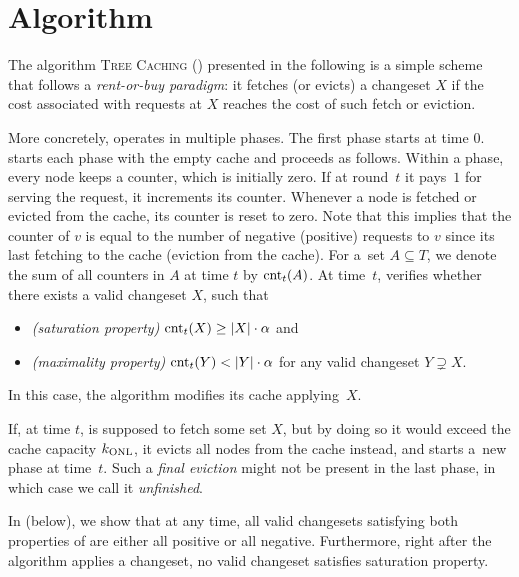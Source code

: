 
\section{Algorithm}\label{sec:algo}

The algorithm \textsc{Tree Caching} (\ALGTC) presented in the following is
a simple scheme that follows a \emph{rent-or-buy paradigm}: it fetches (or evicts)
a changeset $X$ if the cost associated with requests at $X$ reaches the cost of 
such fetch or eviction.

More concretely, \ALGTC operates in multiple phases. The first phase starts at time $0$.
\ALGTC starts each phase with the empty cache and proceeds as follows. Within a
phase, every node keeps a counter, which is initially zero. If at round~$t$ it
pays~$1$ for serving the request, it increments its counter. Whenever a node
is fetched or evicted from the cache, its counter is reset to zero. Note that
this implies that the counter of $v$ is equal to the number of negative
(positive) requests to $v$ since its last fetching to the cache (eviction from
the cache). For a~set $A \subseteq T$, we denote the sum of all counters in
$A$ at time $t$ by $\textrm{cnt}_t(A)$. At time~$t$, \ALGTC verifies whether
there exists a valid changeset $X$, such that
\begin{itemize}
\item \emph{(saturation property)} $\textrm{cnt}_t(X) \geq |X| \cdot \alpha$ and
\item \emph{(maximality property)} $\textrm{cnt}_t(Y) < |Y| \cdot \alpha$ for any valid
  changeset $Y \supsetneq X$.
\end{itemize}
In this case, the algorithm modifies its cache applying~$X$. 

If, at time $t$, \ALGTC is supposed to fetch some set $X$, but by doing so it
would exceed the cache capacity $k_\textnormal{ONL}$, it evicts all nodes from the cache
instead, and starts a~new phase at time~$t$. Such a \emph{final eviction}
might not be present in the last phase, in which case we call it
\emph{unfinished}. 


In  (below), we show that at any
time, all valid changesets satisfying both properties of \ALGTC are either all
positive or all negative. Furthermore, right after the algorithm applies a
changeset, no valid changeset satisfies saturation property.

